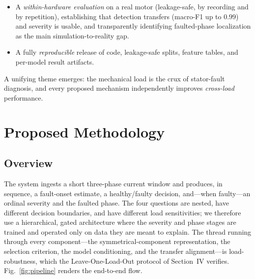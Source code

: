 \documentclass[journal]{IEEEtran}
\begin{document}
\begin{itemize}
tensor (SCST) representation, a load-invariance-regularized feature selection (LIR-mRMR), a
phase-coupled FiLM \emph{load-conditioned} multi-task network (PCM-Net) that injects rather than erases
the operating point, and physics-anchored domain adaptation (PADA) validated
simulation-to-experiment, plus an honest negative result on physics-constrained generative augmentation.
\item A \emph{within-hardware evaluation} on a real motor (leakage-safe, by recording and by
repetition), establishing that detection transfers (macro-F1 up to $0.99$) and severity is
usable, and transparently identifying faulted-phase localization as the main
simulation-to-reality gap.
\item A fully \emph{reproducible} release of code, leakage-safe splits, feature tables, and per-model
result artifacts.
\end{itemize}
A unifying theme emerges: the mechanical load is the crux of stator-fault diagnosis, and every
proposed mechanism independently improves \emph{cross-load} performance.

\section{Proposed Methodology}
\subsection{Overview}
The system ingests a short three-phase current window and produces, in sequence, a fault-onset
estimate, a healthy/faulty decision, and---when faulty---an ordinal severity and the faulted phase.
The four questions are nested, have different decision boundaries, and have different load
sensitivities; we therefore use a hierarchical, gated architecture where the severity and phase
stages are trained and operated only on data they are meant to explain. The thread running through
every component---the symmetrical-component representation, the selection criterion, the model
conditioning, and the transfer alignment---is load-robustness, which the Leave-One-Load-Out
protocol of Section~IV verifies. Fig.~\ref{fig:pipeline} renders the end-to-end flow.
\end{document}
